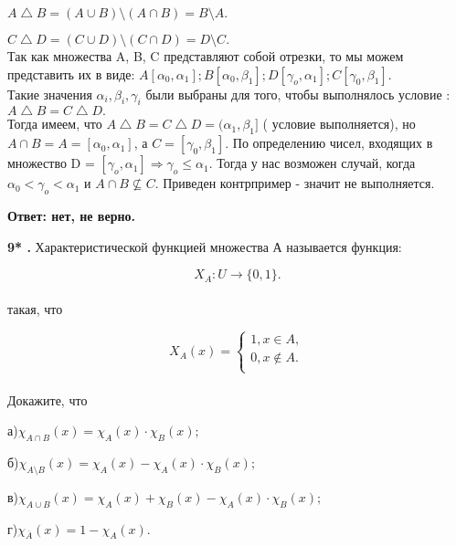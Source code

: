 \documentclass[a4paper,12pt]{article} %
\begin{document}
$A\bigtriangleup B = (A \cup B) \setminus (A \cap B) = B\setminus A.$

$C\bigtriangleup D = (C \cup D) \setminus (C \cap D) = D\setminus C.$\\
Так как множества A, B, C представляют собой отрезки, то мы можем представить их в виде: $A[\alpha_{0},\alpha_{1}]; B[\alpha_{0}, \beta_{1}]; D[\gamma_{o},\alpha_{1}]; C[\gamma_{0},\beta_{1}].$\\
Такие значения $\alpha_{i},\beta_{i},\gamma_{i}$ были выбраны для того, чтобы выполнялось условие : $A\bigtriangleup B = C\bigtriangleup D.$\\
Тогда имеем, что $A\bigtriangleup B = C\bigtriangleup D = (\alpha_{1},\beta_{1}]$ ( условие выполняется), но $A \cap B = A = [\alpha_{0},\alpha_{1}]$, а $C = [\gamma_{0},\beta_{1}]$. По определению чисел, входящих в множество D = $[\gamma_{o},\alpha_{1}] \Rightarrow \gamma_{o} \leq \alpha_{1}$. Тогда у нас возможен случай, когда $\alpha_{0} < \gamma_{o} < \alpha_{1}$ и $A\cap B \nsubseteq C$. Приведен контрпример - значит не выполняется.

 

\begin{flushright}
\begin{large}
\textbf {Ответ: нет, не верно.}
\end{large}
\end{flushright}

{\bf 9* .} Характеристической функцией множества А называется функция:

\[ X_{A}: U \rightarrow \{0,1\} .\]\\
такая, что

\[ X_{A}(x) = \begin{cases}
1 , x\in A,\\
0 , x\notin A.\\ 
\end{cases}\]\\
Докажите, что

а)$\chi_{A\cap B}(x) = \chi_{A}(x) \cdot \chi_{B}(x);$

б)$\chi_{A\setminus B}(x) = \chi_{A}(x) - \chi_{A}(x) \cdot \chi_{B}(x);$

в)$\chi_{A\cup B}(x) = \chi_A(x) + \chi_{B}(x) - \chi_{A}(x)\cdot \chi_{B} (x);$

г)$\chi_{\overline{A}}(x) = 1 - \chi_{A}(x).$
\end{document}
